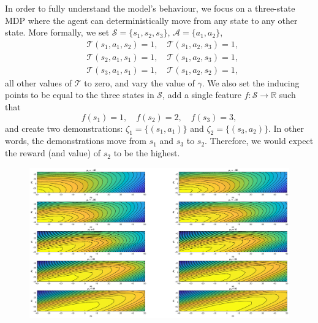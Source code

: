 \documentclass{mpaper}
\begin{document}
In order to fully understand the model's behaviour, we focus on a three-state
MDP where the agent can deterministically move from any state to any other
state. More formally, we set $\mathcal{S} = \{ s_1, s_2, s_3 \}$, $\mathcal{A} =
\{ a_1, a_2 \}$,
\begin{align*}
  &\mathcal{T}(s_1, a_1, s_2) = 1, \quad \mathcal{T}(s_1, a_2, s_3) = 1, \\
  &\mathcal{T}(s_2, a_1, s_1) = 1, \quad \mathcal{T}(s_1, a_2, s_3) = 1, \\
  &\mathcal{T}(s_3, a_1, s_1) = 1, \quad \mathcal{T}(s_1, a_2, s_2) = 1,
\end{align*}
all other values of $\mathcal{T}$ to zero, and vary the value of $\gamma$. We
also set the inducing points to be equal to the three states in $\mathcal{S}$,
add a single feature $f : \mathcal{S} \to \mathbb{R}$ such that
\[
  f(s_1) = 1, \quad f(s_2) = 2, \quad f(s_3) = 3,
\]
and create two demonstrations: $\zeta_1 = \{ (s_1, a_1) \}$ and $\zeta_2 = \{
(s_3, a_2) \}$. In other words, the demonstrations move from $s_1$ and $s_3$ to
$s_2$. Therefore, we would expect the reward (and value) of $s_2$ to be the
highest.

\begin{figure}
  \centering
  \includegraphics[width=\textwidth]{elbo_contour_plots}
\end{figure}
\end{document}
